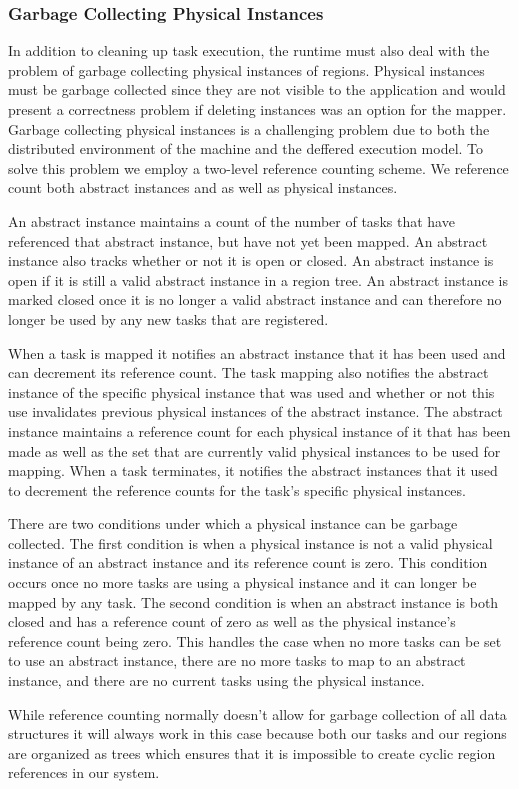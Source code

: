 \subsubsection{Garbage Collecting Physical Instances}
\label{subsec:garbage}
In addition to cleaning up task execution, the runtime must also deal with the problem
of garbage collecting physical instances of regions.  Physical instances must be
garbage collected since they are not visible to the application and would present
a correctness problem if deleting instances was an option for the mapper.  
Garbage collecting physical instances is a challenging problem
due to both the distributed environment of the machine and the deffered execution
model.  To solve this problem we employ a two-level reference counting scheme.  We
reference count both abstract instances and as well as physical instances.  

An abstract instance maintains a count of the number of tasks that have referenced 
that abstract instance, but have not yet been mapped.  An abstract instance also tracks
whether or not it is open or closed.  An abstract instance is open if it is still
a valid abstract instance in a region tree.  An abstract instance is marked closed
once it is no longer a valid abstract instance and can therefore no longer be used
by any new tasks that are registered.

When a task is mapped it notifies an abstract instance that it has been used and can
decrement its reference count.  The task mapping also notifies the abstract instance
of the specific physical instance that was used and whether or not this use invalidates
previous physical instances of the abstract instance.  The abstract instance maintains
a reference count for each physical instance of it that has been made as well as
the set that are currently valid physical instances to be used for mapping.  When a 
task terminates, it notifies the abstract instances that it used to decrement the
reference counts for the task's specific physical instances.

There are two conditions under which a physical instance can be garbage collected.  The
first condition is when a physical instance is not a valid physical instance of
an abstract instance and its reference count is zero.  This condition occurs once no
more tasks are using a physical instance and it can longer be mapped by any task.  The
second condition is when an abstract instance is both closed and has a reference count
of zero as well as the physical instance's reference count being zero.  This handles the
case when no more tasks can be set to use an abstract instance, there are no more tasks
to map to an abstract instance, and there are no current tasks using the physical
instance.

While reference counting normally doesn't allow for garbage collection of all data structures
it will always work in this case because both our tasks and our regions are organized as 
trees which ensures that it is impossible to create cyclic region references in our system.


